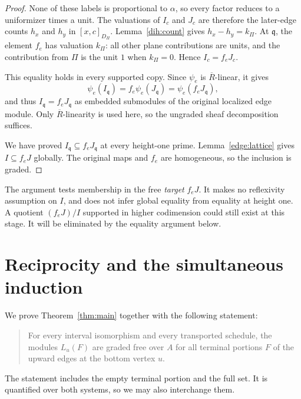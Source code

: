 \begin{proof}
None of these labels is proportional to
\(\alpha\), so every factor reduces to a uniformizer times a unit.
The valuations of \(I_c\) and \(J_c\) are therefore the later-edge
counts \(h_x\) and \(h_y\) in \([x,c]_{D_\Pi}\).
Lemma~\ref{dih:count} gives \(h_x-h_y=k_\Pi\).
At \(\mathfrak q\), the element \(f_e\) has valuation \(k_\Pi\): all
other plane contributions are units, and the contribution from \(\Pi\)
is the unit \(1\) when \(k_\Pi=0\). Hence \(I_c=f_eJ_c\).

This equality holds in every supported copy. Since \(\psi_e\) is
\(\overline R\)-linear, it gives
\[
 \psi_e(I_{\mathfrak q})
 =f_e\psi_e(J_{\mathfrak q})
 =\psi_e(f_eJ_{\mathfrak q}),
\]
and thus \(I_{\mathfrak q}=f_eJ_{\mathfrak q}\) as embedded submodules
of the original localized edge module. Only \(\overline R\)-linearity is
used here, so the ungraded sheaf decomposition suffices.

We have proved \(I_{\mathfrak q}\subseteq f_eJ_{\mathfrak q}\) at every
height-one prime.
Lemma~\ref{edge:lattice} gives \(I\subseteq f_eJ\) globally.
The original maps and \(f_e\) are homogeneous, so the inclusion is graded.
\end{proof}

\begin{remark}\label{edge:codimension}
The argument tests membership in the free \emph{target} \(f_eJ\).
It makes no reflexivity assumption on \(I\), and does not infer
global equality from equality at height one.
A quotient \((f_eJ)/I\) supported in higher codimension could still
exist at this stage. It will be eliminated by the equality argument
below.
\end{remark}

\section{Reciprocity and the simultaneous induction}\label{sec:induction}
We prove Theorem~\ref{thm:main} together with the following statement:
\begin{quote}
For every interval isomorphism and every transported schedule,
the modules \(L_u(F)\) are graded free over \(A\) for all terminal
portions \(F\) of the upward edges at the bottom vertex \(u\).
\end{quote}
The statement includes the empty terminal portion and the full set.
It is quantified over both systems, so we may also interchange them.

